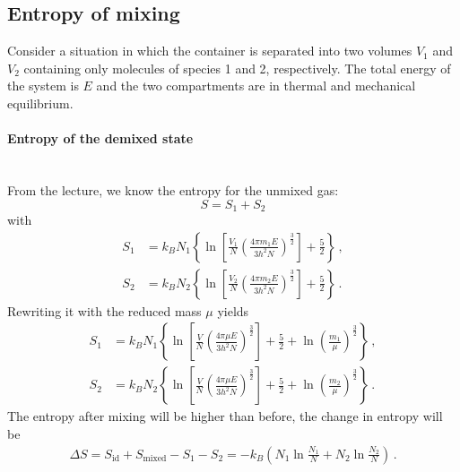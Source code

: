 \subsection{Entropy of mixing}
    Consider a situation in which the container is separated into two volumes 
    $V_1$ and $V_2$ containing only molecules of species 1 and 2, respectively. 
    The total energy of the system is $E$ and the two compartments are in 
    thermal and mechanical equilibrium. 

\paragraph{Entropy of the demixed state} \ \\
    From the lecture, we know the entropy for the unmixed gas:
    \begin{equation}
        S = S_1 + S_2
    \end{equation}
    with 
    \begin{align}
    S_1 &= k_B N_1 \left\{ \ln\left[ \frac{V_1}{N} \left( \frac{4\pi m_1 E}{3h^2N} \right)^{\frac{3}{2}}  \right] + \frac{5}{2} \right\} \,, \\
    S_2 &= k_B N_2 \left\{ \ln\left[ \frac{V_2}{N} \left( \frac{4\pi m_2 E}{3h^2N} \right)^{\frac{3}{2}}  \right] + \frac{5}{2} \right\} \,.
    \end{align}
    Rewriting it with the reduced mass $\mu$ yields
    \begin{align}
    S_1 &= k_B N_1 \left\{ \ln\left[ \frac{V}{N} \left( \frac{4\pi \mu E}{3h^2N} \right)^{\frac{3}{2}}  \right] + \frac{5}{2} + \ln\left( \frac{m_1}{\mu} \right)^{\frac{3}{2}} \right\} \,, \\
    S_2 &= k_B N_2 \left\{ \ln\left[ \frac{V}{N} \left( \frac{4\pi \mu E}{3h^2N} \right)^{\frac{3}{2}}  \right] + \frac{5}{2} + \ln\left( \frac{m_2}{\mu} \right)^{\frac{3}{2}} \right\} \,.
    \end{align}
    The entropy after mixing will be higher than before, the change in entropy will be
    \begin{align}
    \Delta S = S_{\text{id}} + S_{\text{mixed}} - S_1 - S_2 = - k_B \left( N_1 \ln\frac{N_1}{N} + N_2 \ln\frac{N_2}{N} \right) \,.
    \end{align}